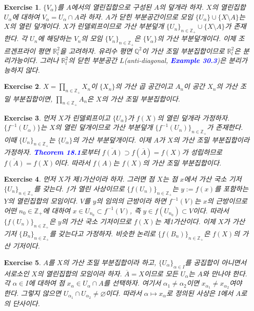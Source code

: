\documentclass{article}
\newtheorem{exercise}{Exercise}[section]
\newcommand{\Q}{\mathbb{Q}}
\newcommand{\R}{\mathbb{R}}
\newcommand{\Z}{\mathbb{Z}}
\begin{document}
\begin{exercise}
    $\{V_\alpha\}$를 $A$에서의 열린집합으로 구성된 $A$의 덮개라 하자. $X$의 열린집합 $U_\alpha$에 대하여 $V_\alpha=U_\alpha\cap A$라 하자. $A$가 닫힌 부분공간이므로 모임 $\{U_\alpha\}\cup\{X\setminus A\}$는 $X$의 열린 덮개이다. $X$가 린델뢰프이므로 가산 부분덮개 $\{U_n\}_{n\in\Z_+}\cup\{X\setminus A\}$가 존재한다. 각 $U_n$에 해당하는 $V_n$의 모임 $\{V_n\}_{n\in\Z_+}$은 $\{V_\alpha\}$의 가산 부분덮개이다. 이제 조르겐프라이 평면 $\R_l^2$을 고려하자. 유리수 평면 $\Q^2$이 가산 조밀 부분집합이므로 $\R_l^2$은 분리가능이다. 그러나 $\R_l^2$의 닫힌 부분공간 $L$(anti-diagonal, \textcolor{blue}{\textbf{Example 30.3}})은 분리가능하지 않다.
\end{exercise}

\begin{exercise}
    $X=\prod_{n\in\Z_+}X_n$이 $\{X_n\}$의 가산 곱 공간이고 $A_n$이 공간 $X_n$의 가산 조밀 부분집합이면, $\prod_{n\in\Z_+}A_n$은 $X$의 가산 조밀 부분집합이다.
\end{exercise}

\begin{exercise}
    먼저 $X$가 린델뢰프이고 $\{U_\alpha\}$가 $f(X)$의 열린 덮개라 가정하자. $\{f^{-1}(U_\alpha)\}$는 $X$의 열린 덮개이므로 가산 부분덮개 $\{f^{-1}(U_n)\}_{n\in\Z_+}$가 존재한다. 이때 $\{U_n\}_{n\in\Z_+}$는 $\{U_\alpha\}$의 가산 부분덮개이다. 이제 $A$가 $X$의 가산 조밀 부분집합이라 가정하자. \textcolor{blue}{\textbf{Theorem 18.1}}로부터 $\overline{f(A)}\supset f(\overline{A})=f(X)$가 성립하므로 $\overline{f(A)}=f(X)$이다. 따라서 $f(A)$는 $f(X)$의 가산 조밀 부분집합이다.
\end{exercise}

\begin{exercise}
    먼저 $X$가 제1가산이라 하자. 그러면 점 $X$는 점 $x$에서 가산 국소 기저 $\{U_n\}_{n\in\Z_+}$를 갖는다. $f$가 열린 사상이므로 $\{f(U_n)\}_{n\in\Z_+}$는 $y:=f(x)$를 포함하는 $Y$의 열린집합의 모임이다. $V$를 $y$의 임의의 근방이라 하면 $f^{-1}(V)$는 $x$의 근방이므로 어떤 $n_0\in\Z_+$에 대하여 $x\in U_{n_0}\subset f^{-1}(V)$, 즉 $y\in f(U_{n_0})\subset V$이다. 따라서 $\{f(U_n)\}_{n\in\Z_+}$은 $y$의 가산 국소 기저이므로 $f(X)$는 제1가산이다. 이제 $X$가 가산 기저 $\{B_n\}_{n\in\Z_+}$를 갖는다고 가정하자. 비슷한 논리로 $\{f(B_n)\}_{n\in\Z_+}$은 $f(X)$의 가산 기저이다.
\end{exercise}

\begin{exercise}
    $A$를 $X$의 가산 조밀 부분집합이라 하고, $\{U_\alpha\}_{\alpha\in I}$를 공집합이 아니면서 서로소인 $X$의 열린집합의 모임이라 하자. $\overline{A}=X$이므로 모든 $U_\alpha$는 $A$와 만나야 한다. 각 $\alpha\in I$에 대하여 점 $x_\alpha\in U_\alpha\cap A$를 선택하자. 여기서 $\alpha_1\ne\alpha_2$이면 $x_{\alpha_1}\ne x_{\alpha_2}$여야 한다. 그렇지 않으면 $U_{\alpha_1}\cap U_{\alpha_2}\ne\varnothing$이다. 따라서 $\alpha\mapsto x_\alpha$로 정의된 사상은 $I$에서 $A$로의 단사이다.
\end{exercise}
\end{document}
